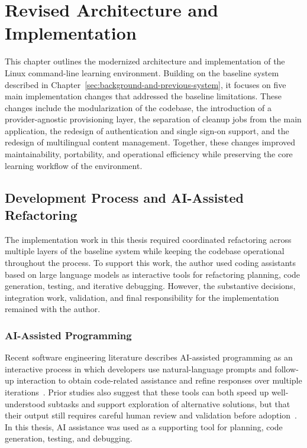 

\section{Revised Architecture and Implementation} \label{sec:revised-architecture-and-implementation}
This chapter outlines the modernized architecture and implementation of the Linux command-line learning environment.
Building on the baseline system described in Chapter~\ref{sec:background-and-previous-system}, it focuses on five main implementation changes that addressed the baseline limitations.
These changes include the modularization of the codebase, the introduction of a provider-agnostic provisioning layer, the separation of cleanup jobs from the main application, the redesign of authentication and single sign-on support, and the redesign of multilingual content management.
Together, these changes improved maintainability, portability, and operational efficiency while preserving the core learning workflow of the environment.

\subsection{Development Process and AI-Assisted Refactoring} \label{subsec:development-process-and-ai-assisted-refactoring}
The implementation work in this thesis required coordinated refactoring across multiple layers of the baseline system while keeping the codebase operational throughout the process.
To support this work, the author used coding assistants based on large language models as interactive tools for refactoring planning, code generation, testing, and iterative debugging.
However, the substantive decisions, integration work, validation, and final responsibility for the implementation remained with the author.

\subsubsection{AI-Assisted Programming} \label{subsubsec:ai-assisted-programming}
Recent software engineering literature describes AI-assisted programming as an interactive process in which developers use natural-language prompts and follow-up interaction to obtain code-related assistance and refine responses over multiple iterations~\cite{ross_programmers_2023,barke_grounded_2023}.
Prior studies also suggest that these tools can both speed up well-understood subtasks and support exploration of alternative solutions, but that their output still requires careful human review and validation before adoption~\cite{barke_grounded_2023}.
In this thesis, AI assistance was used as a supporting tool for planning, code generation, testing, and debugging.

